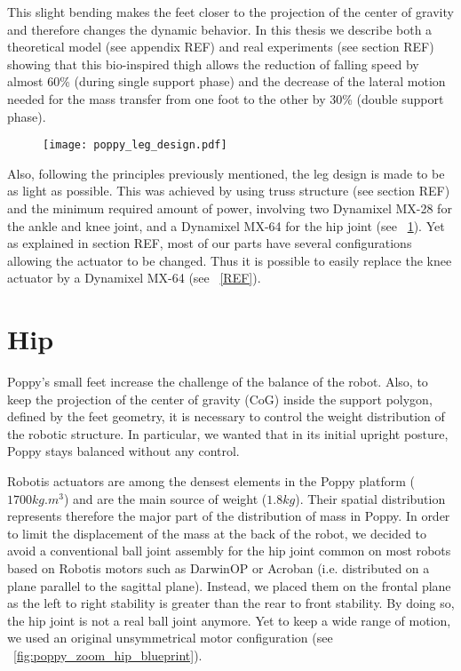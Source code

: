 This slight bending makes the feet closer to the projection of the center of gravity and therefore changes the dynamic behavior.
In this thesis we describe both a theoretical model (see appendix REF) and real experiments (see section REF) showing that this bio-inspired thigh allows the reduction of falling speed by almost 60\% (during single support phase) and the decrease of the lateral motion needed for the mass transfer from one foot to the other by 30\% (double support phase).


\begin{figure}[p]
    \begin{center}
        \texttt{[image: poppy\_leg\_design.pdf]}
    \end{center}
    \caption{}
    \label{fig:poppy_leg_design}
\end{figure}


Also, following the principles previously mentioned, the leg design is made to be as light as possible. This was achieved by using truss structure (see section REF) and the minimum required amount of power, involving two Dynamixel MX-28 for the ankle and knee joint, and a Dynamixel MX-64 for the hip joint (see \figurename~\ref{fig:poppy_leg_design}). Yet as explained in section REF, most of our parts have several configurations allowing the actuator to be changed. Thus it is possible to easily replace the knee actuator by a Dynamixel MX-64 (see \figurename~\ref{REF}).



\section{Hip} %
\label{sec:hip}


Poppy's small feet increase the challenge of the balance of the robot. Also, to keep the projection of the center of gravity (CoG) inside the support polygon, defined by the feet geometry, it is necessary to control the weight distribution of the robotic structure. In particular, we wanted that in its initial upright posture, Poppy stays balanced without any control.

Robotis actuators are among the densest elements in the Poppy platform ($ 1700 kg.m^{3} $) and are the main source of weight ($1.8 kg$). Their spatial distribution represents therefore the major part of the distribution of mass in Poppy. In order to limit the displacement of the mass at the back of the robot, we decided to avoid a conventional ball joint assembly for the hip joint common on most robots based on Robotis motors such as DarwinOP or Acroban (i.e. distributed on a plane parallel to the sagittal plane). Instead, we placed them on the frontal plane as the left to right stability is greater than the rear to front stability. By doing so, the hip joint is not a real ball joint anymore. Yet to keep a wide range of motion, we used an original unsymmetrical motor configuration (see \figurename~\ref{fig:poppy_zoom_hip_blueprint}).

